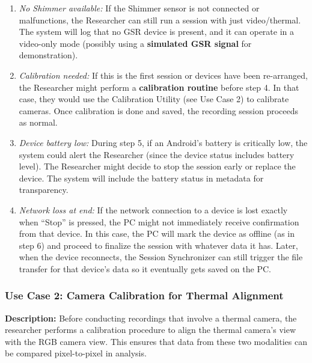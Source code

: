 \documentclass[12pt,a4paper]{article}
\begin{document}
\begin{itemize}
  \begin{enumerate}
  \def\labelenumi{\alph{enumi}.}
  \tightlist
  \item
    \emph{No Shimmer available:} If the Shimmer sensor is not connected or malfunctions, the Researcher can still run a session with just video/thermal. The system will log that no GSR device is present, and it can operate in a video-only mode (possibly using a \textbf{simulated GSR signal} for demonstration).\\
  \item
    \emph{Calibration needed:} If this is the first session or devices have been re-arranged, the Researcher might perform a \textbf{calibration routine} before step 4. In that case, they would use the Calibration Utility (see Use Case 2) to calibrate cameras. Once calibration is done and saved, the recording session proceeds as normal.\\
  \item
    \emph{Device battery low:} During step 5, if an Android's battery is critically low, the system could alert the Researcher (since the device status includes battery level). The Researcher might decide to stop the session early or replace the device. The system will include the battery status in metadata for transparency.\\
  \item
    \emph{Network loss at end:} If the network connection to a device is lost exactly when ``Stop'' is pressed, the PC might not immediately receive confirmation from that device. In this case, the PC will mark the device as offline (as in step 6) and proceed to finalize the session with whatever data it has. Later, when the device reconnects, the Session Synchronizer can still trigger the file transfer for that device's data so it eventually gets saved on the PC.
  \end{enumerate}
\end{itemize}

\subsubsection{Use Case 2: Camera Calibration for Thermal Alignment}\label{use-case-2-camera-calibration-for-thermal-alignment}

\textbf{Description:} Before conducting recordings that involve a thermal camera, the researcher performs a calibration procedure to align the thermal camera's view with the RGB camera view. This ensures that data from these two modalities can be compared pixel-to-pixel in analysis.
\end{document}
